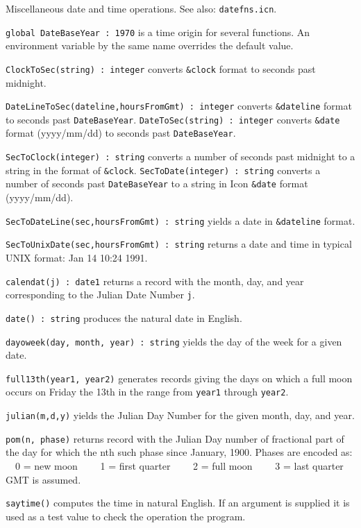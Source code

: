 Miscellaneous date and time operations. See also: \texttt{datefns.icn}.

\texttt{global DateBaseYear : 1970} is a time origin for several
functions. An environment
variable by the same name overrides the default value.

\texttt{ClockToSec(string) : integer} converts
\texttt{\&clock} format to seconds past midnight.

\texttt{DateLineToSec(dateline,hoursFromGmt) : integer} converts
\texttt{\&dateline} format to seconds past \texttt{DateBaseYear}.
\texttt{DateToSec(string) : integer} converts
\texttt{\&date} format (yyyy/mm/dd) to seconds past
\texttt{DateBaseYear}.

\texttt{SecToClock(integer) : string} converts a number of seconds past
midnight to a string in the format of \texttt{\&clock}.
\texttt{SecToDate(integer) : string} converts a number of seconds past
\texttt{DateBaseYear} to a string in Icon \texttt{\&date} format
(yyyy/mm/dd).

\texttt{SecToDateLine(sec,hoursFromGmt) : string} yields a date in
\texttt{\&dateline} format.

\texttt{SecToUnixDate(sec,hoursFromGmt) : string} returns a date and
time in typical UNIX format: Jan 14 10:24 1991.

\texttt{calendat(j) : date1} returns a record with the month, day, and
year corresponding to the Julian Date Number \texttt{j}.

\texttt{date() : string} produces the natural date in English.

\texttt{dayoweek(day, month, year) : string} yields the day of the
week for a given date.

\texttt{full13th(year1, year2)} generates records giving the days on
which a full moon occurs on Friday the 13th in the range from
\texttt{year1} through \texttt{year2}.

\texttt{julian(m,d,y)} yields the Julian Day Number for the given
month, day, and year.

\texttt{pom(n, phase)} returns record with the Julian Day number of
fractional part of the day for which the nth such phase since January,
1900. Phases are encoded as:\\
\ \ 0 = new moon \ \ \ \ 1 = first quarter \ \ \ \ 2 = full moon
\ \ \ \ 3 = last quarter\\
GMT is assumed.

\texttt{saytime()} computes the time in natural English. If an argument
is supplied it is used as a test value to check the operation the
program.

